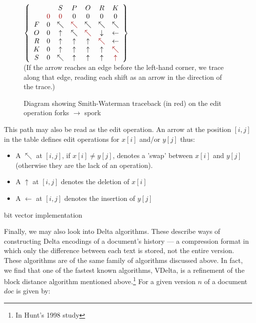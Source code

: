 \documentclass[a4paper,11pt,twoside,notitlepage]{article}
\begin{document}
        \begin{figure}[h!]
          \centering
          $\left\{
                \begin{array}{ccccccc}
                    &   & S & P & O & R & K \\
                    & \color{red}{0} & \color{red}{0} & 0 & 0 & 0 & 0 \\
                  F & 0 & \nwarrow & \color{red}{\nwarrow} & \nwarrow & \nwarrow & \nwarrow \\
                  O & 0 & \uparrow & \nwarrow & \color{red}{\nwarrow} & \downarrow & \leftarrow \\
                  R & 0 & \uparrow & \uparrow & \uparrow & \color{red}{\nwarrow} & \leftarrow \\
                  K & 0 & \uparrow & \uparrow & \uparrow & \uparrow & \color{red}{\nwarrow} \\
                  S & 0 & \nwarrow & \uparrow & \uparrow & \uparrow & \color{red}{\uparrow} \\
                \end{array}\right\} $\\
                (If the arrow reaches an edge before the left-hand
                corner, we trace along that edge, reading each shift
                as an arrow in the direction of the trace.)
                \caption{Diagram showing Smith-Waterman traceback (in
                  red) on the edit operation forks $\rightarrow$
                  spork}
          \label{fig:smith-waterman-traceback}
        \end{figure}

        This path may also be read as the edit operation. An arrow at
        the position $[i,j]$ in the table defines edit operations for
        $x[i]$ and/or $y[j]$ thus:
        \begin{itemize}
          \item A $\nwarrow$ at $[i,j]$, if
        $x[i] \neq y[j]$, denotes a 'swap' between $x[i]$ and $y[j]$
        (otherwise they are the lack of an operation).
          \item A $\uparrow$ at $[i,j]$ denotes the deletion of $x[i]$
          \item A $\leftarrow$ at $[i,j]$ denotes the insertion of $y[j]$
        \end{itemize}

        bit vector implementation\cite{Hyyro2003}

        Finally, we may also look into Delta algorithms. These
        describe ways of constructing Delta encodings of a document's
        history --- a compression format in which only the difference
        between each text is stored, not the entire version. These
        algorithms are of the same family of algorithms discussed
        above. In fact, we find that one of the fastest known
        algorithms, VDelta, is a refinement of the block distance
        algorithm mentioned above.\footnote{In Hunt's 1998
          study\cite{Hunt1998}} For a given version $n$ of a document
        $doc$ is given by:
        
\end{document}
